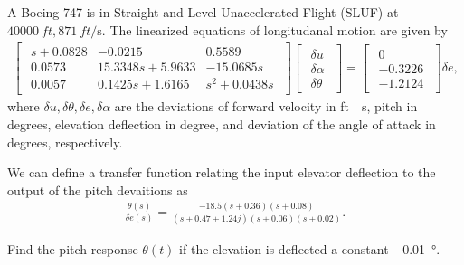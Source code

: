
\begin{prob}
    A Boeing 747 is in Straight and Level Unaccelerated Flight (SLUF) at \( \SI{40000}{ft}, \SI{871}{ft \per \second}\).
    The linearized equations of longitudanal motion are given by
    \begin{align}
        \begin{bmatrix}
            \begin{array}{ccc}
                s + 0.0828 & -0.0215 & 0.5589 \\
                0.0573 & 15.3348s + 5.9633 & -15.0685s \\
                0.0057 & 0.1425s + 1.6165 & s^2 + 0.0438s
            \end{array}
        \end{bmatrix}
        \begin{bmatrix}
            \begin{array}{c}
                \delta u \\ \delta \alpha \\ \delta \theta
            \end{array}
        \end{bmatrix}
        =
        \begin{bmatrix}
            \begin{array}{c}
                0 \\ -0.3226 \\ -1.2124
            \end{array}
        \end{bmatrix}
        \delta e ,
    \end{align}
    where \( \delta u, \delta \theta, \delta e, \delta \alpha\) are the deviations of forward velocity in \si{ft \per \second}, pitch in degrees, elevation deflection in degree, and deviation of the angle of attack in degrees, respectively.

We can define a transfer function relating the input elevator deflection to the output of the pitch devaitions as
\begin{align}
    \frac{\theta(s)}{\delta e(s)} = \frac{-18.5 (s + 0.36) (s+0.08)}{(s + 0.47 \pm 1.24 j)(s+0.06)(s+0.02)} .
\end{align}

\begin{subprob}
    \item Find the pitch response \( \theta (t) \) if the elevation is deflected a constant \SI{-0.01}{\degree}.
\end{subprob}
\end{prob}

